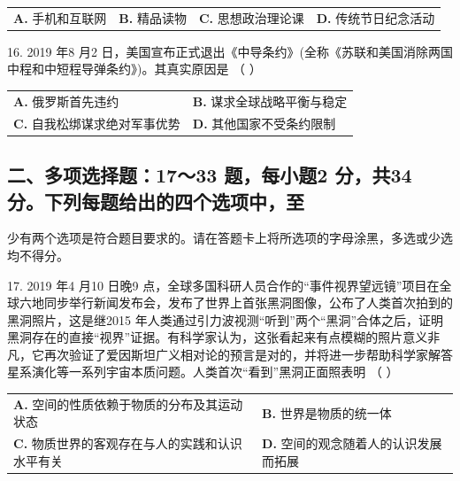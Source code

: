 \documentclass[UTF8,11pt]{ctexart}
\begin{document}
\begin{center}\begin{tabular}{>{\raggedright\arraybackslash}p{\dimexpr(\linewidth-8\tabcolsep)/4\relax}>{\raggedright\arraybackslash}p{\dimexpr(\linewidth-8\tabcolsep)/4\relax}>{\raggedright\arraybackslash}p{\dimexpr(\linewidth-8\tabcolsep)/4\relax}>{\raggedright\arraybackslash}p{\dimexpr(\linewidth-8\tabcolsep)/4\relax}}
\textbf{A.} 手机和互联网 & \textbf{B.} 精品读物 & \textbf{C.} 思想政治理论课 & \textbf{D.} 传统节日纪念活动\\[.35em]\end{tabular}\end{center}

16. 2019 年8 月2 日，美国宣布正式退出《中导条约》(全称《苏联和美国消除两国中程和中短程导弹条约》)。其真实原因是 （    ）


\begin{center}\begin{tabular}{>{\raggedright\arraybackslash}p{\dimexpr(\linewidth-4\tabcolsep)/2\relax}>{\raggedright\arraybackslash}p{\dimexpr(\linewidth-4\tabcolsep)/2\relax}}
\textbf{A.} 俄罗斯首先违约 & \textbf{B.} 谋求全球战略平衡与稳定\\[.35em]
\textbf{C.} 自我松绑谋求绝对军事优势 & \textbf{D.} 其他国家不受条约限制\\[.35em]\end{tabular}\end{center}

\subsection*{二、多项选择题：17～33 题，每小题2 分，共34 分。下列每题给出的四个选项中，至}

少有两个选项是符合题目要求的。请在答题卡上将所选项的字母涂黑，多选或少选均不得分。


17. 2019 年4 月10 日晚9 点，全球多国科研人员合作的“事件视界望远镜”项目在全球六地同步举行新闻发布会，发布了世界上首张黑洞图像，公布了人类首次拍到的黑洞照片，这是继2015 年人类通过引力波视测“听到”两个“黑洞”合体之后，证明黑洞存在的直接“视界”证据。有科学家认为，这张看起来有点模糊的照片意义非凡，它再次验证了爱因斯坦广义相对论的预言是对的，并将进一步帮助科学家解答星系演化等一系列宇宙本质问题。人类首次“看到”黑洞正面照表明 （    ）


\begin{center}\begin{tabular}{>{\raggedright\arraybackslash}p{\dimexpr(\linewidth-4\tabcolsep)/2\relax}>{\raggedright\arraybackslash}p{\dimexpr(\linewidth-4\tabcolsep)/2\relax}}
\textbf{A.} 空间的性质依赖于物质的分布及其运动状态 & \textbf{B.} 世界是物质的统一体\\[.35em]
\textbf{C.} 物质世界的客观存在与人的实践和认识水平有关 & \textbf{D.} 空间的观念随着人的认识发展而拓展\\[.35em]\end{tabular}\end{center}
\end{document}
